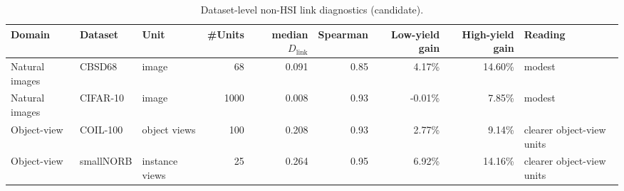 
\begin{table}[t]
\centering
\caption{Dataset-level non-HSI link diagnostics (candidate).}
\begin{tabular}{@{}l l l r r r r r l@{}}
\toprule
Domain & Dataset & Unit & \#Units & median $D_{\mathrm{link}}$ & Spearman & Low-yield gain & High-yield gain & Reading \\
\midrule
Natural images & CBSD68 & image & 68 & 0.091 & 0.85 & 4.17\% & 14.60\% & modest \\
Natural images & CIFAR-10 & image & 1000 & 0.008 & 0.93 & -0.01\% & 7.85\% & modest \\
Object-view & COIL-100 & object views & 100 & 0.208 & 0.93 & 2.77\% & 9.14\% & clearer object-view units \\
Object-view & smallNORB & instance views & 25 & 0.264 & 0.95 & 6.92\% & 14.16\% & clearer object-view units \\
\bottomrule
\end{tabular}
\end{table}

